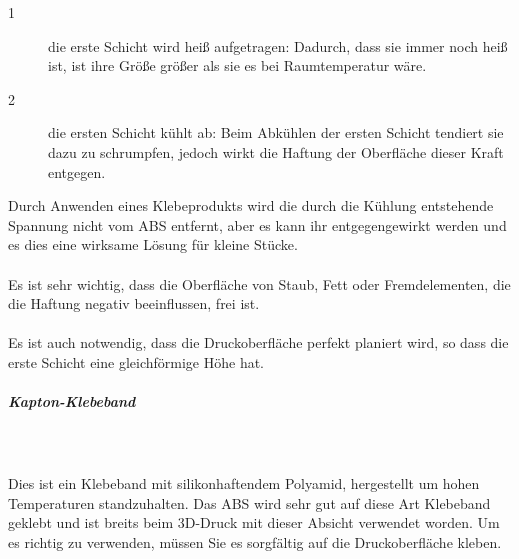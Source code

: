 \documentclass[11pt,a4paper]{article}
\begin{document}
\begin{description}
\item[1] die erste Schicht wird heiß aufgetragen: Dadurch, dass sie immer noch heiß ist, ist ihre Größe größer als sie es bei Raumtemperatur wäre. 
\item[2] die ersten Schicht kühlt ab: Beim Abkühlen der ersten Schicht tendiert sie dazu zu schrumpfen, jedoch wirkt die Haftung der Oberfläche dieser Kraft entgegen.
\end{description}
Durch Anwenden eines Klebeprodukts wird die durch die Kühlung entstehende Spannung nicht vom ABS entfernt, aber es kann ihr entgegengewirkt werden und es dies eine wirksame Lösung für kleine Stücke. 
\\\\
Es ist sehr wichtig, dass die Oberfläche von Staub, Fett oder Fremdelementen, die die Haftung negativ beeinflussen, frei ist. 
\\\\
Es ist auch notwendig, dass die Druckoberfläche perfekt planiert wird, so dass die erste Schicht eine gleichförmige Höhe hat. 
				\subparagraph{Kapton-Klebeband}\mbox{}\\\\
Dies ist ein Klebeband mit silikonhaftendem Polyamid, hergestellt um hohen Temperaturen standzuhalten. Das ABS wird sehr gut auf diese Art Klebeband geklebt und ist breits beim 3D-Druck mit dieser Absicht verwendet worden. Um es richtig zu verwenden, müssen Sie es sorgfältig auf die Druckoberfläche kleben.
\end{document}
